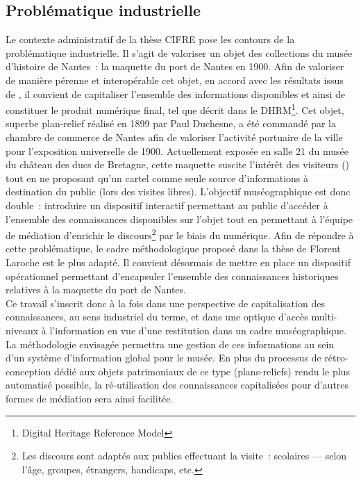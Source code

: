\documentclass[a4paper,11pt,french]{article}
\begin{document}
\subsection{Problématique industrielle}

Le contexte administratif de la thèse CIFRE pose les contours de la problématique industrielle. Il s'agit de valoriser un objet des collections du musée d'histoire de Nantes~: la maquette du port de Nantes en 1900. Afin de valoriser de manière pérenne et interopérable cet objet, en accord avec les résultats issus de , il convient de capitaliser l'ensemble des informations disponibles et ainsi de constituer le produit numérique final, tel que décrit dans le DHRM\footnote{Digital Heritage Reference Model}.
Cet objet, superbe plan-relief réalisé en 1899 par Paul Duchesne, a été commandé par la chambre de commerce de Nantes afin de valoriser l'activité portuaire de la ville pour l'exposition universelle de 1900\cite{GuilletB1999, Naegel2011}. Actuellement exposée en salle 21 du musée du château des ducs de Bretagne, cette maquette suscite l'intérêt des visiteurs () tout en ne proposant qu'un cartel comme seule source d'informations à destination du public (lors des visites libres). 
L'objectif muséographique est donc double~: introduire un dispositif interactif permettant au public d'accéder à l'ensemble des connaissances disponibles sur l'objet tout en permettant à l'équipe de médiation d'enrichir le discours\footnote{Les discours sont adaptés aux publics effectuant la visite~: scolaires --- selon l'âge, groupes, étrangers, handicaps, etc.} par le biais du numérique.
Afin de répondre à cette problématique, le cadre méthodologique proposé dans la thèse de Florent Laroche\cite{Laroche2007} est le plus adapté. Il convient désormais de mettre en place un dispositif opérationnel permettant d'encapsuler l'ensemble des connaissances historiques relatives à la maquette du port de Nantes.\\

Ce travail s'inscrit donc à la fois dans une perspective de capitalisation des connaissances, au sens industriel du terme, et dans une optique d'accès multi-niveaux à l'information en vue d'une restitution dans un cadre muséographique. La méthodologie envisagée permettra une gestion de ces informations au sein d'un système d'information global pour le musée.
En plus du processus de rétro-conception dédié aux objets patrimoniaux de ce type (plans-reliefs) rendu le plus automatisé possible, la ré-utilisation des connaissances capitalisées pour d'autres formes de médiation sera ainsi facilitée.
\end{document}

